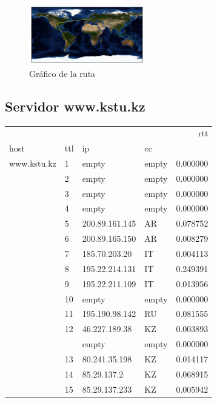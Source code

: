 \begin{figure}[H]
  \centering
    \includegraphics[width=0.45\textwidth]{grafico-rutas/www-fu-berlin-de.png}
  \caption{Gráfico de la ruta}
  \label{entropia-s}
\end{figure}




\subsection{Servidor www.kstu.kz}
\begin{center}
\begin{tabular}{llllr}
\toprule
            &    &               &    &       rtt \\
host & ttl & ip & cc &           \\
\midrule
www.kstu.kz & 1  & empty & empty &  0.000000 \\
            & 2  & empty & empty &  0.000000 \\
            & 3  & empty & empty &  0.000000 \\
            & 4  & empty & empty &  0.000000 \\
            & 5  & 200.89.161.145 & AR &  0.078752 \\
            & 6  & 200.89.165.150 & AR &  0.008279 \\
            & 7  & 185.70.203.20 & IT &  0.004113 \\
            & 8  & 195.22.214.131 & IT&  0.249391 \\
            & 9  & 195.22.211.109 & IT&  0.013956 \\
            & 10 & empty & empty &  0.000000 \\
            & 11 & 195.190.98.142 & RU &  0.081555 \\
            & 12 & 46.227.189.38 & KZ &  0.003893 \\
            &    & empty & empty &  0.000000 \\
            & 13 & 80.241.35.198 & KZ &  0.014117 \\
            & 14 & 85.29.137.2 & KZ &  0.068915 \\
            & 15 & 85.29.137.233 & KZ &  0.005942 \\
\bottomrule
\end{tabular}
\end{center}


